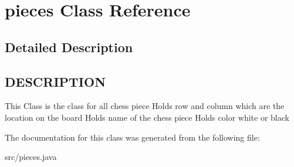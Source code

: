 \hypertarget{classpieces}{\section{pieces Class Reference}
\label{classpieces}
}


\subsection{Detailed Description}
\hypertarget{classvalidMoveTest_DESCRIPTION}{}\subsection{D\-E\-S\-C\-R\-I\-P\-T\-I\-O\-N}\label{classvalidMoveTest_DESCRIPTION}
This Class is the class for all chess piece Holds row and column which are the location on the board Holds name of the chess piece Holds color white or black 

The documentation for this class was generated from the following file\-:\begin{DoxyCompactItemize}
\item 
src/pieces.\-java\end{DoxyCompactItemize}

